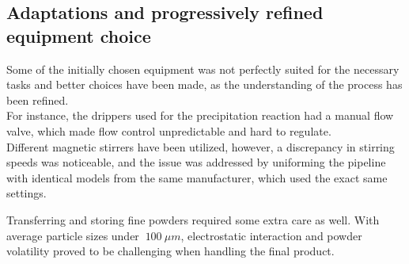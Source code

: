 \documentclass[a4paper]{article}
\begin{document}
        \subsection{Adaptations and progressively refined equipment choice\label{faulty_equipment}}

        Some of the initially chosen equipment was not perfectly suited for the necessary tasks and better choices have been made, as the 
        understanding of the process has been refined. \\ 

        For instance, the drippers used for the precipitation reaction had a manual flow valve, which made flow control unpredictable 
        and hard to regulate. \\ 

%

        Different magnetic stirrers have been utilized, however, a discrepancy 
        in stirring speeds was noticeable, and the issue was addressed by uniforming the pipeline with identical models from the same manufacturer, 
        which used the exact same settings. 


%

        Transferring and storing fine powders required some extra care as well. With average particle sizes under $ \ 100 \ \mu m$, 
        electrostatic interaction and powder volatility proved to be challenging when handling the final product. 
        
\end{document}
